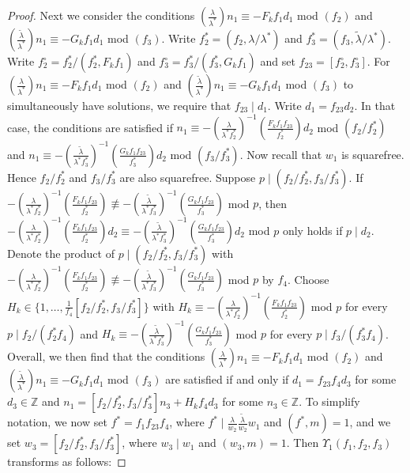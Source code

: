 \documentclass{amsart}
\numberwithin{equation}{section}
\begin{document}
\begin{proof}
\vspace{3mm} Next we consider the conditions $  (\frac{\lambda}{\lambda^*})n_1  \equiv - F_k f_1d_1 $ mod $(f_2)$ and $  ( \frac{\widetilde{\lambda}}{\lambda^*}) n_1  \equiv -G_kf_1d_1  $ mod $(f_3)$. Write $f_2^* = (f_2, \lambda/\lambda^*)$ and $f_3^* = (f_3, \widetilde{\lambda}/\lambda^*)$.  Write $f_2^\circ=f_2^*/(f_2^*, F_k f_1)$ and $f_3^\circ=f_3^*/(f_3^*, G_k f_1)$ and set $f_{23} = [f_2^\circ, f_3^\circ]$. For $  (\frac{\lambda}{\lambda^*})n_1  \equiv - F_k f_1d_1 $ mod $(f_2)$ and $  ( \frac{\widetilde{\lambda}}{\lambda^*}) n_1  \equiv -G_kf_1d_1  $  mod $(f_3)$ to simultaneously have solutions, we require that $f_{23} \mid d_1$. Write $d_1 = f_{23} d_2$. In that case, the conditions are satisfied if $  n_1  \equiv - (\frac{\lambda}{\lambda^* f_2^*})^{-1}(\frac{F_k f_1f_{23}}{f_2^*})d_2 $ mod $(f_2/f_2^*)$ and $  n_1  \equiv -( \frac{\widetilde{\lambda}}{\lambda^*f_3^*})^{-1}(\frac{G_kf_1f_{23}}{f_3^*})d_2  $ mod $(f_3/f_3^*)$. Now recall that $w_1$ is squarefree. Hence $f_2/f_2^*$ and $f_3/f_3^*$ are also squarefree. Suppose $p \mid (f_2/f_2^*,f_3/f_3^*)$. If $- (\frac{\lambda}{\lambda^* f_2^*})^{-1}(\frac{F_k f_1f_{23}}{f_2^*}) \not\equiv -( \frac{\widetilde{\lambda}}{\lambda^*f_3^*})^{-1}(\frac{G_kf_1f_{23}}{f_3^*})$ mod $p$, then $- (\frac{\lambda}{\lambda^* f_2^*})^{-1}(\frac{F_k f_1f_{23}}{f_2^*})d_2 \equiv -( \frac{\widetilde{\lambda}}{\lambda^*f_3^*})^{-1}(\frac{G_kf_1f_{23}}{f_3^*}) d_2$ mod $p$ only holds if $p \mid d_2$. Denote the product of $p\mid (f_2/f_2^*,f_3/f_3^*)$ with  $- (\frac{\lambda}{\lambda^* f_2^*})^{-1}(\frac{F_k f_1f_{23}}{f_2^*}) \not\equiv -( \frac{\widetilde{\lambda}}{\lambda^*f_3^*})^{-1}(\frac{G_kf_1f_{23}}{f_3^*})$ mod $p$ by $f_4$. Choose $H_k \in \{1, \dots, \frac{1}{f_4} [f_2/f_2^*, f_3/f_3^*]\}$ with $H_k \equiv - (\frac{\lambda}{\lambda^* f_2^*})^{-1}(\frac{F_k f_1f_{23}}{f_2^*})$ mod $p$ for every $p \mid f_2/(f_2^*f_4)$ and $H_k \equiv  -( \frac{\widetilde{\lambda}}{\lambda^*f_3^*})^{-1}(\frac{G_kf_1f_{23}}{f_3^*})$ mod $p$ for every $p \mid f_3/(f_3^*f_4)$. Overall, we then find that the conditions $  (\frac{\lambda}{\lambda^*})n_1  \equiv - F_k f_1d_1 $ mod $(f_2)$ and $  ( \frac{\widetilde{\lambda}}{\lambda^*}) n_1  \equiv -G_kf_1d_1  $ mod $(f_3)$ are satisfied  if and only if $d_1 = f_{23} f_4 d_3$ for some $d_3 \in \mathbb{Z}$ and $n_1 = [f_2/f_2^*, f_3/f_3^*] n_3+H_k f_4 d_3$ for some $n_3 \in \mathbb{Z}$.  To simplify notation, we now set $f^*=f_1f_{23}f_4  $, where $f^* \mid \frac{\lambda}{w_2}\frac{\widetilde{\lambda}}{w_2}w_1$ and $(f^*,m)=1$, and we set $w_3 = [f_2/f_2^*, f_3/f_3^*]$, where $w_3 \mid w_1$ and $(w_3,m)=1$. Then $\Upsilon_1(f_1,f_2,f_3)$ transforms as follows: 

\end{proof}
\end{document}
